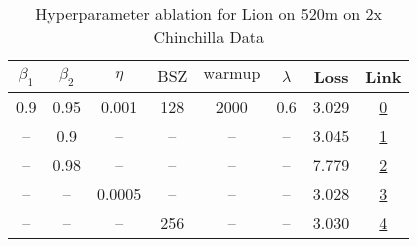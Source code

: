 \begin{table}[H]
\centering
\caption{Hyperparameter ablation for Lion on 520m on 2x Chinchilla Data}
\label{tab:ablation_lion_520m_2}
\begin{tabular}{cccccccc}
\toprule
$\beta_1$ & $\beta_2$ & $\eta$ & $\mathrm{BSZ}$ & $\mathrm{warmup}$ & $\lambda$ & Loss & Link \\
\midrule
0.9 & 0.95 & 0.001 & 128 & 2000 & 0.6 & 3.029 & \href{https://wandb.ai/stanford-mercury/optimizer-scaling/runs/sweep-520m-21B-lion30535dlr0.001-wd0.6-minlr0-warmup2000-b10.9-b-c72b9c}{0} \\
\midrule
-- & 0.9 & -- & -- & -- & -- & 3.045 & \href{https://wandb.ai/stanford-mercury/optimizer-scaling/runs/sweep-520m-21B-lion6d497blr0.001-wd0.6-minlr0-warmup2000-b10.9-b-deb100}{1} \\
-- & 0.98 & -- & -- & -- & -- & 7.779 & \href{https://wandb.ai/stanford-mercury/optimizer-scaling/runs/sweep-520m-21B-lion70e78flr0.001-wd0.6-minlr0-warmup2000-b10.9-b-bd75ef}{2} \\
-- & -- & 0.0005 & -- & -- & -- & 3.028 & \href{https://wandb.ai/stanford-mercury/optimizer-scaling/runs/sweep-520m-21B-lion9e353dlr0.0005-wd0.6-minlr0-warmup2000-b10.9--0e18f5}{3} \\
-- & -- & -- & 256 & -- & -- & 3.030 & \href{https://wandb.ai/stanford-mercury/optimizer-scaling/runs/sweep-520m-21B-lion4bc061lr0.001-wd0.6-minlr0-warmup2000-b10.9-b-979e97}{4} \\
\bottomrule
\end{tabular}
\end{table}

